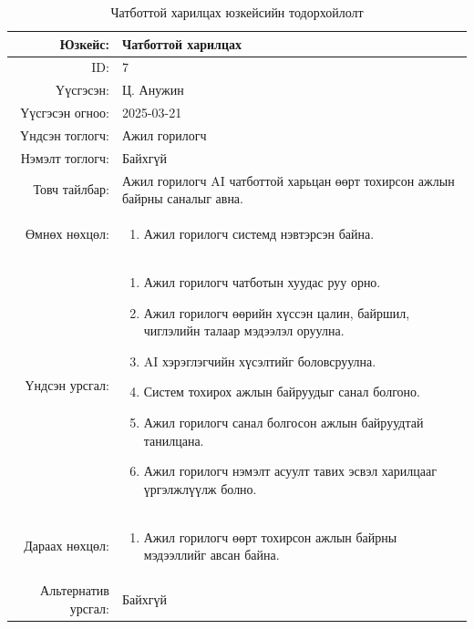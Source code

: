 \begin{longtable}{|r|p{11.5cm}|}
    \caption{Чатботтой харилцах юзкейсийн тодорхойлолт}
    \label{table:usecase7}\\ \hline
    {Юзкейс:} & {Чатботтой харилцах}\\ \hline
    {ID:} & {7}\\ \hline
    {Үүсгэсэн:} & {Ц. Анужин}\\ \hline
    {Үүсгэсэн огноо:} & {2025-03-21}\\ \hline
    {Үндсэн тоглогч:} & {Ажил горилогч}\\ \hline
    {Нэмэлт тоглогч:} & {Байхгүй}\\ \hline
    {Товч тайлбар:} & {Ажил горилогч AI чатботтой харьцан өөрт тохирсон ажлын байрны саналыг авна.}\\ \hline
    {Өмнөх нөхцөл:} & {\begin{enumerate}[nosep]
        \item Ажил горилогч системд нэвтэрсэн байна.
    \end{enumerate}}\\ \hline
    {Үндсэн урсгал:} & {\begin{enumerate}[nosep]
        \item Ажил горилогч чатботын хуудас руу орно.
        \item Ажил горилогч өөрийн хүссэн цалин, байршил, чиглэлийн талаар мэдээлэл оруулна.
        \item AI хэрэглэгчийн хүсэлтийг боловсруулна.
        \item Систем тохирох ажлын байруудыг санал болгоно.
        \item Ажил горилогч санал болгосон ажлын байруудтай танилцана.
        \item Ажил горилогч нэмэлт асуулт тавих эсвэл харилцааг үргэлжлүүлж болно.
    \end{enumerate}}\\ \hline
    {Дараах нөхцөл:} & {\begin{enumerate}[nosep]
        \item Ажил горилогч өөрт тохирсон ажлын байрны мэдээллийг авсан байна.
    \end{enumerate}}\\ \hline
    {Альтернатив урсгал:} & {Байхгүй}\\ \hline
\end{longtable}

